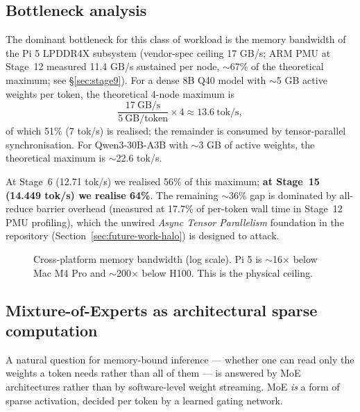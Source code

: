 \documentclass[10pt,a4paper]{article}
\begin{document}
\subsection{Bottleneck analysis}
The dominant bottleneck for this class of workload is the memory bandwidth of the Pi 5 LPDDR4X subsystem (vendor-spec ceiling 17 GB/s; ARM PMU at Stage~12 measured 11.4 GB/s sustained per node, $\sim$67\% of the theoretical maximum; see \S\ref{sec:stage9}). For a dense 8B Q40 model with $\sim$5 GB active weights per token, the theoretical 4-node maximum is
\[
\frac{17~\text{GB/s}}{5~\text{GB/token}} \times 4 \approx 13.6~\text{tok/s},
\]
of which 51\% (7 tok/s) is realised; the remainder is consumed by tensor-parallel synchronisation. For Qwen3-30B-A3B with $\sim$3 GB of active weights, the theoretical maximum is $\sim$22.6 tok/s.

At Stage~6 (12.71 tok/s) we realised 56\% of this maximum; \textbf{at Stage~15 (14.449 tok/s) we realise 64\%}. The remaining $\sim$36\% gap is dominated by all-reduce barrier overhead (measured at 17.7\% of per-token wall time in Stage~12 PMU profiling), which the unwired \emph{Async Tensor Parallelism} foundation in the repository (Section~\ref{sec:future-work-halo}) is designed to attack.

\begin{figure}[H]
\centering
{}
\caption{Cross-platform memory bandwidth (log scale). Pi 5 is $\sim$16$\times$ below Mac M4 Pro and $\sim$200$\times$ below H100. This is the physical ceiling.}
\end{figure}

\subsection{Mixture-of-Experts as architectural sparse computation}
A natural question for memory-bound inference --- whether one can read only the weights a token needs rather than all of them --- is answered by MoE architectures rather than by software-level weight streaming. MoE \emph{is} a form of sparse activation, decided per token by a learned gating network.
\end{document}
